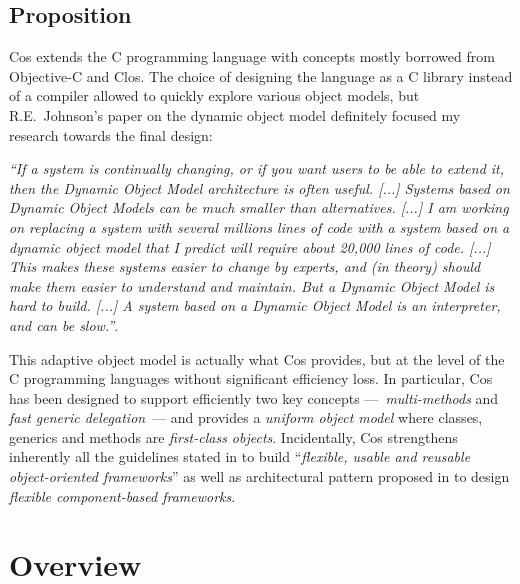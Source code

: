 \documentclass[preprint,10pt]{sigplanconf}
\newcommand{\ProgLang}[1]{{\sc #1}\xspace}
\newcommand{\Clos}      {\ProgLang{Clos}}
\newcommand{\Cos}       {\ProgLang{Cos}}
\newcommand{\Objc}      {\ProgLang{Objective-C}}
\begin{document}
\subsection{Proposition}



















\Cos extends the C programming language with concepts \cite{mitch01} mostly borrowed from \Objc and \Clos. The choice of designing the language as a C library instead of a compiler allowed to quickly explore various object models, but R.E.~Johnson's paper on the dynamic object model \cite{john98} definitely focused my research towards the final design:

{\em ``If a system is continually changing, or if you want users to be able to extend it, then the Dynamic Object Model architecture is often useful. [...] Systems based on Dynamic Object Models can be much smaller than alternatives. [...] I am working on replacing a system with several millions lines of code with a system based on a dynamic object model that I predict will require about 20,000 lines of code. [...] This makes these systems easier to change by experts, and (in theory) should make them easier to understand and maintain. But a Dynamic Object Model is hard to build. [...] A system based on a Dynamic Object Model is an interpreter, and can be slow.''}.

This adaptive object model \cite{john00, john02} is actually what \Cos provides, but at the level of the C programming languages without significant efficiency loss. In particular, \Cos has been designed to support efficiently two key concepts ---~{\em multi-methods} and {\em fast generic delegation}~--- and provides a {\em uniform object model} where classes, generics and methods are {\em first-class objects}. Incidentally, \Cos strengthens inherently all the guidelines stated in \cite{bos01} to build ``{\em flexible, usable and reusable object-oriented frameworks}'' as well as architectural pattern proposed in \cite{tel05} to design {\em flexible component-based frameworks}.



\section{Overview\label{sec:cos}}
\end{document}
